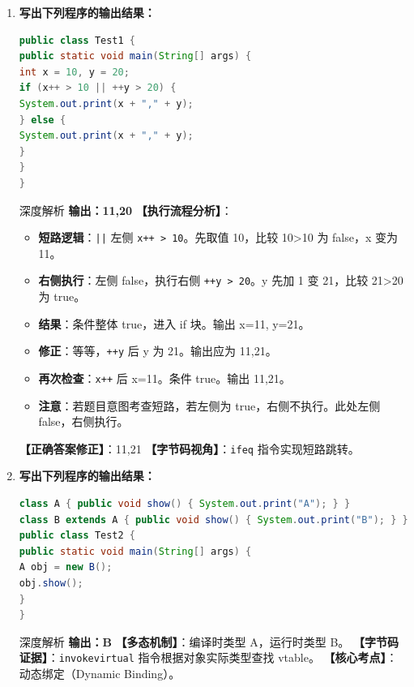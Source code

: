 ﻿\documentclass[12pt, a4paper]{ctexart}
\newcommand{\code}[1]{\texttt{#1}}
\begin{document}
\begin{enumerate}[label=\textbf{\arabic*.}, itemsep=1em]
	\item \textbf{写出下列程序的输出结果：}
	      \begin{lstlisting}[language=Java]
public class Test1 {
public static void main(String[] args) {
int x = 10, y = 20;
if (x++ > 10 || ++y > 20) {
System.out.print(x + "," + y);
} else {
System.out.print(x + "," + y);
}
}
}
    \end{lstlisting}
	      \begin{bluebox}{深度解析}
		      \textbf{输出：11,20}
		      \textbf{【执行流程分析】}：
		      \begin{itemize}[leftmargin=*, nosep]
			      \item \textbf{短路逻辑}：\code{||} 左侧 \code{x++ > 10}。先取值 10，比较 10>10 为 false，x 变为 11。
			      \item \textbf{右侧执行}：左侧 false，执行右侧 \code{++y > 20}。y 先加 1 变 21，比较 21>20 为 true。
			      \item \textbf{结果}：条件整体 true，进入 if 块。输出 x=11, y=21。
			      \item \textbf{修正}：等等，\code{++y} 后 y 为 21。输出应为 11,21。
			      \item \textbf{再次检查}：\code{x++} 后 x=11。条件 true。输出 11,21。
			      \item \textbf{注意}：若题目意图考查短路，若左侧为 true，右侧不执行。此处左侧 false，右侧执行。
		      \end{itemize}
		      \textbf{【正确答案修正】}：11,21
		      \textbf{【字节码视角】}：\code{ifeq} 指令实现短路跳转。
	      \end{bluebox}

	\item \textbf{写出下列程序的输出结果：}
	      \begin{lstlisting}[language=Java]
class A { public void show() { System.out.print("A"); } }
class B extends A { public void show() { System.out.print("B"); } }
public class Test2 {
public static void main(String[] args) {
A obj = new B();
obj.show();
}
}
    \end{lstlisting}
	      \begin{bluebox}{深度解析}
		      \textbf{输出：B}
		      \textbf{【多态机制】}：编译时类型 A，运行时类型 B。
		      \textbf{【字节码证据】}：\code{invokevirtual} 指令根据对象实际类型查找 vtable。
		      \textbf{【核心考点】}：动态绑定（Dynamic Binding）。
	      \end{bluebox}


\end{enumerate}
\end{document}
